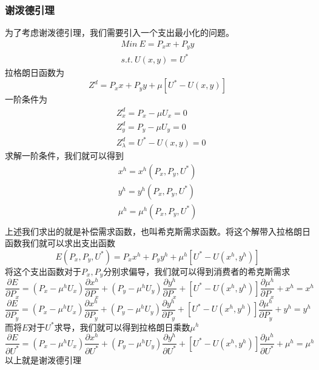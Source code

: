 \documentclass[UTF8,12pt]{ctexart}
\numberwithin{equation}{section} %
\numberwithin{figure}{section}
\numberwithin{table}{section}
\begin{document}
	\subsubsection{谢泼德引理}
	为了考虑谢泼德引理，我们需要引入一个支出最小化的问题。
	\begin{equation}
		\begin{aligned}
			Min \ E = P_xx + P_yy \\
			s.t. \ U(x,y) = U^*
		\end{aligned}
	\end{equation}	
	拉格朗日函数为
	\begin{equation}
		Z^d = P_xx + P_yy + \mu[U^* - U(x,y)]
	\end{equation}
	一阶条件为
	\begin{equation}
		\begin{aligned}
			&Z^d_x = P_x - \mu U_x = 0 \\
			&Z^d_y = P_y - \mu U_y = 0 \\
			&Z^d_{\lambda} = U^* - U(x,y) = 0
		\end{aligned}
	\end{equation}
	求解一阶条件，我们就可以得到
	\begin{equation}
		\begin{aligned}
			x^h = x^h(P_x,P_y,U^*) \\
			y^h = y^h(P_x,P_y,U^*) \\
			\mu^h = \mu^h(P_x,P_y,U^*) \\
		\end{aligned}
	\end{equation}
	上述我们求出的就是补偿需求函数，也叫希克斯需求函数。将这个解带入拉格朗日函数我们就可以求出支出函数
	\begin{equation}
		E(P_x,P_y,U^*) = P_xx^h + P_yy^h + \mu^h[U^* - U(x^h,y^h)]
	\end{equation}
	将这个支出函数对于$P_x,P_y$分别求偏导，我们就可以得到消费者的希克斯需求
	\begin{equation}
		\frac{\partial E}{\partial P_x} = 
		(P_x - \mu^hU_x)\frac{\partial x^h}{\partial P_x} + (P_y - \mu^hU_y)\frac{\partial y^h}{\partial P_x} + [U^* - U(x^h,y^h)]\frac{\partial \mu^h}{\partial P_x} + x^h = x^h
	\end{equation}
	\begin{equation}
		\frac{\partial E}{\partial P_y} = 
		(P_x - \mu^hU_x)\frac{\partial x^h}{\partial P_y} + (P_y - \mu^hU_y)\frac{\partial y^h}{\partial P_y} + [U^* - U(x^h,y^h)]\frac{\partial \mu^h}{\partial P_y} + y^h = y^h
	\end{equation}
	而将$E$对于$U^*$求导，我们就可以得到拉格朗日乘数$\mu^h$
	\begin{equation}
		\frac{\partial E}{\partial U^*} = 
		(P_x - \mu^hU_x)\frac{\partial x^h}{\partial U^*} + (P_y - \mu^hU_y)\frac{\partial y^h}{\partial U^*} + [U^* - U(x^h,y^h)]\frac{\partial \mu^h}{\partial U^*} + \mu^h = \mu^h
	\end{equation}
	以上就是谢泼德引理
	
\end{document}
